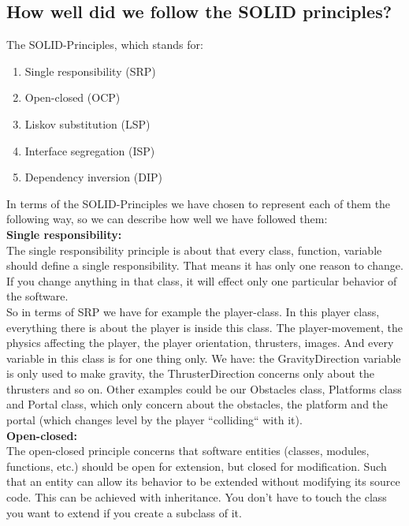 \documentclass[../master.tex]{subfile}
\begin{document}
\subsection{How well did we follow the SOLID principles?}
The SOLID-Principles, which stands for:
\begin{enumerate}
	\item Single responsibility (SRP)
	\item Open-closed (OCP)
	\item Liskov substitution (LSP)
	\item Interface segregation (ISP)
	\item Dependency inversion (DIP)
\end{enumerate}

In terms of the SOLID-Principles we have chosen to represent each of them the following way, so we can describe how well we have followed them:\\

\noindent\textbf{Single responsibility:}\\
The single responsibility principle is about that every class, function, variable should define a single responsibility. That means it has only one reason to change. If you change anything in that class, it will effect only one particular behavior of the software.\\

\noindent So in terms of SRP we have for example the player-class. In this player class, everything there is about the player is inside this class. The player-movement, the physics affecting the player, the player orientation, thrusters, images. And every variable in this class is for one thing only. We have: the GravityDirection variable is only used to make gravity, the ThrusterDirection concerns only about the thrusters and so on. Other examples could be our Obstacles class, Platforms class and Portal class, which only concern about the obstacles, the platform and the portal (which changes level by the player ``colliding`` with it).\\

\noindent\textbf{Open-closed:}\\
The open-closed principle concerns that software entities (classes, modules, functions, etc.) should be open for extension, but closed for modification. Such that an entity can allow its behavior to be extended without modifying its source code. This can be achieved with inheritance. You don’t have to touch the class you want to extend if you create a subclass of it.\\
\end{document}
